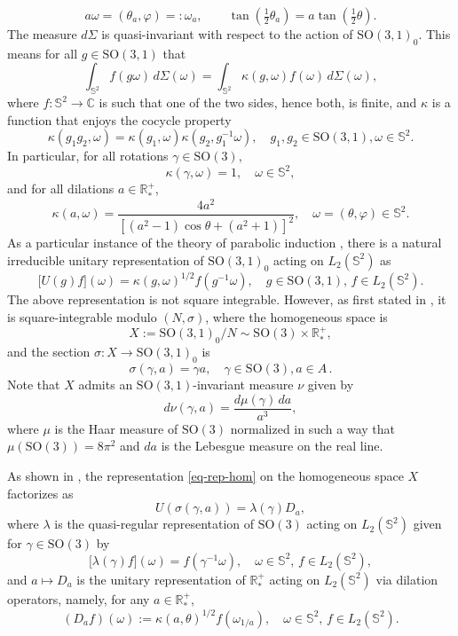 \documentclass[a4paper,11pt,DIV=11,%
abstract=on%
]{scrartcl}
\def\SO{{\mathrm{SO}}}
\def\C{{\mathbb C}}
\def\R{{\mathbb R}}
\newcommand{\blue}[1]{#1}
\begin{document}
{  \[
a \omega = (\theta_a ,\varphi)=:\omega_a, \qquad  \tan(\tfrac{1}{2}\theta_a)=a\tan(\tfrac{1}{2}\theta).
\]
The measure $d\Sigma$ is quasi-invariant with respect to the action of
$\SO(3,1)_0$. This means for all $g\in\SO(3,1)$ that
  \begin{equation}
\int_{\mathbb S^2} f(g\omega)\, d\Sigma(\omega)= \int_{\mathbb S^2} \kappa(g,\omega)
f(\omega)\, d\Sigma(\omega)
,\label{quasi}
\end{equation}
where $f:\mathbb S^2\to\C$ is such that one of the two sides, hence both, is
  finite, and   $\kappa$ is a function that enjoys the cocycle property
\begin{equation}\label{eq-cocycle}
	\kappa(g_1 g_2,\omega)=\kappa(g_1,\omega)\kappa(g_2,g_1^{-1}\omega),\quad g_1,g_2\in \SO(3,1), \omega\in \mathbb S^2 .
      \end{equation}     
In particular, for all rotations $\gamma\in\SO(3)$, 
      \[ \kappa(\gamma,\omega) =     1, \quad \omega \in \mathbb S^2,\]
and for all dilations $a\in\R_*^+$, 
\[
\kappa(a,\omega) = \frac{4a^2}{[(a^2-1)\cos\theta+(a^2+1)]^2}, \quad \omega = (\theta,\varphi) \in \mathbb S^2.
  \]
As a particular instance of the theory of parabolic induction
\cite{knapp2013lie}, there is a   natural irreducible unitary
representation of $\SO(3,1)_0$ acting on $L_2(\mathbb S^2)$ as
\begin{equation}\label{eq-rep-hom}
\bigl[U(g)f\bigr](\omega)=\kappa(g,\omega)^{1/2}f(g^{-1}\omega),\quad g\in \SO(3,1), \, f\in L_2( \mathbb S^2).
\end{equation}
The above representation is not square integrable. However, as
first stated in \cite{AV99}, it is
square-integrable modulo $(N,\sigma)$, where  the  homogeneous space is
\[
  X:=\SO(3,1)_0/N\sim \SO(3)\times\R_*^+,
  \]
and  the section $\sigma: X\to \SO(3,1)_0$ is 
$$\sigma(\gamma,a)=\gamma a,\quad \gamma\in \SO(3), a\in A\,.$$
Note that  $X$ admits an $\SO(3,1)$-invariant measure $\nu$ given by
$$d\nu(\gamma,a)=\frac{d\mu(\gamma)\,da}{a^3},$$
where  $\mu$ is the Haar measure of $\SO(3)$ normalized in such a way
that $\mu(\SO(3))=8\pi^2$ and $da$ is the Lebesgue measure on the real
line. 

As shown in \cite[Prop. 3.2]{AV99},  the representation
\eqref{eq-rep-hom} on the \blue{homogeneous} space $X$ factorizes as 
	$$U(\sigma(\gamma,a))=\lambda(\gamma)D_a,$$
where  $\lambda$ is the quasi-regular representation of $\SO(3)$
acting on  $L_2(\mathbb S^2)$ given for $\gamma\in \SO(3)$ by
\begin{equation}\label{prop-rep-factorized}
\bigl[\lambda(\gamma)f\bigr](\omega)=f(\gamma^{-1}\omega),\quad
\omega\in\mathbb S^2,\, f\in L_2(\mathbb S^2),
\end{equation}
and $a\mapsto D_a$ is the unitary representation of $\R_*^+$ acting on
$L_2(\mathbb S^2)$ via dilation operators, namely, for any $a\in\R_*^+$,  
	$$(D_a f)(\omega) :=\kappa(a,\theta)^{1/2} f(\omega_{1/a}),
        \quad \omega\in\mathbb S^2,\, f\in L_2(\mathbb S^2) .$$

}
\end{document}
